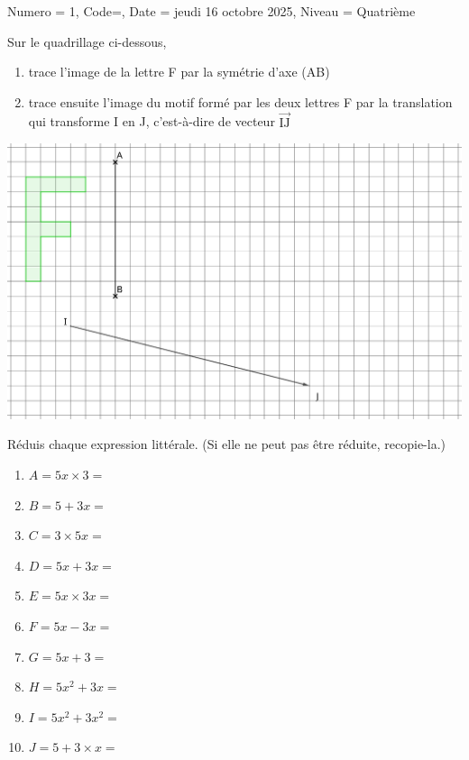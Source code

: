 \documentclass[11pt]{article}
\newcommand{\ligne}{{\color{gray!60}\hrulefill}}
\begin{document}
\begin{Maquette}[DM]{
        Numero = 1, Code={}, Date = jeudi 16 octobre 2025, Niveau = Quatrième
    }

    \begin{exercice}
        Sur le quadrillage ci-dessous,
        \begin{enumerate}
            \item trace l’image de la lettre F par la symétrie d’axe (AB)
            \item trace ensuite l’image du motif formé par les deux lettres F par la translation qui transforme I en J, c’est-à-dire de vecteur $\overrightarrow{\textrm{IJ}}$
        \end{enumerate}
        \begin{center}
            \includegraphics[width=\linewidth]{Images/Exercice1.png}
        \end{center}
    \end{exercice}
    
    \begin{exercice}
        Réduis chaque expression littérale. (Si elle ne peut pas être réduite, recopie-la.)
        \setlength{\columnsep}{1cm}
        \begin{multicols}{3}
            \begin{enumerate}[itemsep=1em]
                \item $A = 5 x \times 3 =$ \ligne
                \item $B = 5 + 3x = $ \ligne
                \item $C = 3 \times 5x =$ \ligne
                \item $D = 5x + 3x =$ \ligne
                \item $E = 5x \times 3x =$ \ligne
                \item $F = 5x - 3x =$ \ligne
                \item $G = 5x + 3 =$ \ligne 
                \item $H = 5x^2 + 3x = $ \ligne
                \item $I = 5x^2 + 3x^2 = $ \ligne
                \item $J = 5 + 3 \times x = $ \ligne
            \end{enumerate}
        \end{multicols}
    \end{exercice}

\end{Maquette}
\end{document}
